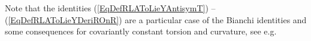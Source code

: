 \documentclass [11pt] {article}
\theoremstyle{definition}
\begin{document}
\noindent Note that the identities (\ref{EqDefRLAToLieYAntisymT}) --
(\ref{EqDefRLAToLieYDeriROnR}) are a particular case of the Bianchi identities and some consequences for covariantly constant torsion and curvature, see
e.g.~\cite[p.~135, Thm.~5.3]{KN63}
\end{document}
